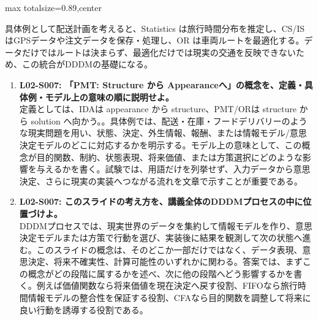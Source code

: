 \begin{minipage}[t]{0.58\textwidth}
\begin{adjustbox}{max totalsize={\textwidth}{0.89\textheight},center}
\begin{minipage}{\textwidth}
具体例として配送計画を考えると、Statistics は旅行時間分布を推定し、CS/IS はGPSデータや注文データを保存・処理し、OR は車両ルートを最適化する。データだけではルートは決まらず、最適化だけでは現実の交通を反映できないため、この統合がDDDMの基礎になる。\par{}\begin{enumerate}\item \textbf{L02-S007: 「PMT: Structure から Appearanceへ」の概念を、定義・具体例・モデル上の意味の順に説明せよ。}\\定義としては、IDAは appearance から structure、PMT/ORは structure から solution へ向かう。。具体例では、配送・在庫・フードデリバリーのような現実問題を用い、状態、決定、外生情報、報酬、または情報モデル/意思決定モデルのどこに対応するかを明示する。モデル上の意味として、この概念が目的関数、制約、状態表現、将来価値、または方策選択にどのような影響を与えるかを書く。試験では、用語だけを列挙せず、入力データから意思決定、さらに現実の実装へつながる流れを文章で示すことが重要である。\item \textbf{L02-S007: このスライドの考え方を、講義全体のDDDMプロセスの中に位置づけよ。}\\DDDMプロセスでは、現実世界のデータを集約して情報モデルを作り、意思決定モデルまたは方策で行動を選び、実装後に結果を観測して次の状態へ進む。このスライドの概念は、そのどこか一部だけではなく、データ表現、意思決定、将来不確実性、計算可能性のいずれかに関わる。答案では、まずこの概念がどの段階に属するかを述べ、次に他の段階へどう影響するかを書く。例えば価値関数なら将来価値を現在決定へ戻す役割、FIFOなら旅行時間情報モデルの整合性を保証する役割、CFAなら目的関数を調整して将来に良い行動を誘導する役割である。\end{enumerate}
\end{minipage}
\end{adjustbox}
\end{minipage}


